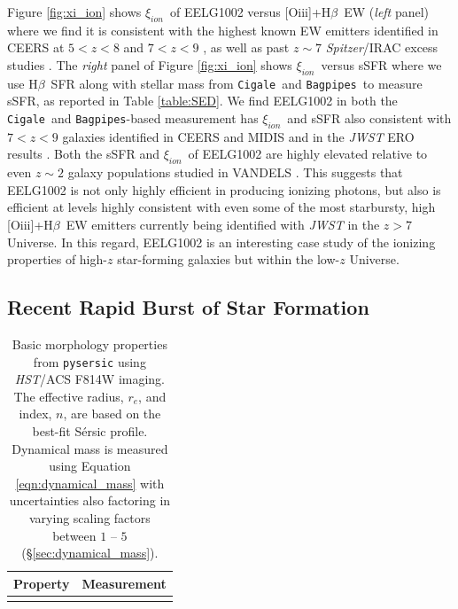 \documentclass[twocolumn,tight,times,linenumbers]{aastex631}
\newcommand{\hbeta}{H$\beta$}
\newcommand{\oiii}{[O{\sc iii}]}
\newcommand{\xiion}{$\xi_{ion}$}
\newcommand{\cigale}{\texttt{Cigale}}
\newcommand{\bagpipes}{\texttt{Bagpipes}}
\begin{document}
		Figure \ref{fig:xi_ion} shows \xiion~of EELG1002 versus \oiii+\hbeta~EW (\textit{left} panel) where we find it is consistent with the highest known EW emitters identified in CEERS at $5  < z < 8$  \citep{Chen2024} and $7 < z < 9$ \citep{Tang2023}, as well as past $z \sim 7$ \textit{Spitzer}/IRAC excess studies \citep{Endsley2021}. The \textit{right} panel of Figure \ref{fig:xi_ion} shows \xiion~versus sSFR where we use \hbeta~SFR along with stellar mass from \cigale~and \bagpipes~to measure sSFR, as reported in Table \ref{table:SED}. We find EELG1002 in both the \cigale~and \bagpipes-based measurement has \xiion~and sSFR also consistent with $7 < z < 9$ galaxies identified in CEERS \citep{Whitler2024} and MIDIS \citep{Rinaldi2023} and in the \textit{JWST} ERO results \citep{Sun2023}. Both the sSFR and \xiion~of EELG1002 are highly elevated relative to even $z \sim 2$ galaxy populations studied in VANDELS \citep{Castellano2023}. This suggests that EELG1002 is not only highly efficient in producing ionizing photons, but also is efficient at levels highly consistent with even some of the most starbursty, high \oiii+\hbeta~EW emitters currently being identified with \textit{JWST} in the $ z> 7$ Universe. In this regard, EELG1002 is an interesting case study of the ionizing properties of high-$z$ star-forming galaxies but within the low-$z$ Universe.
		

		\subsection{Recent Rapid Burst of Star Formation}
		\label{sec:sfh}
		
		\begin{table}
			\centering
			\caption{Basic morphology properties from \texttt{pysersic} using \textit{HST}/ACS F814W imaging. The effective radius, $r_e$, and index, $n$, are based on the best-fit S\'ersic profile. Dynamical mass is measured using Equation \ref{eqn:dynamical_mass} with uncertainties also factoring in varying scaling factors between $1$ -- $5$ (\S\ref{sec:dynamical_mass}).}
			\label{table:morphology}
			\begin{tabular*}{\columnwidth}{@{\extracolsep{\fill}}lc}
				\hline
				Property & Measurement \\
				\hline
				\MorphologyTable
				\hline				
			\end{tabular*}
		\end{table}
\end{document}
